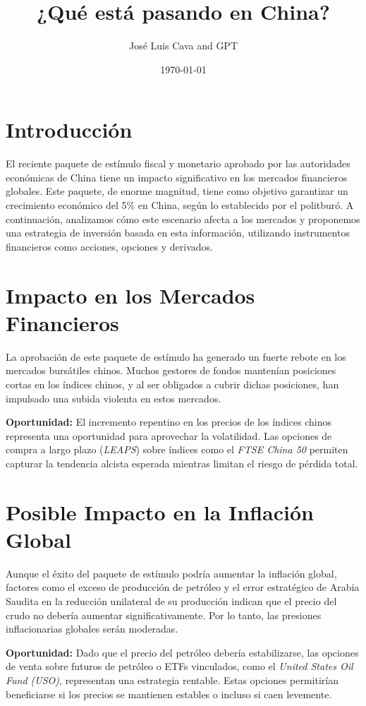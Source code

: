 \documentclass{article}
\title{¿Qué está pasando en China?}
\author{José Luis Cava and GPT}
\date{\today}
\begin{document}
\maketitle

\section*{Introducción}

El reciente paquete de estímulo fiscal y monetario aprobado por las autoridades económicas de China tiene un impacto significativo en los mercados financieros globales. Este paquete, de enorme magnitud, tiene como objetivo garantizar un crecimiento económico del 5\% en China, según lo establecido por el politburó. A continuación, analizamos cómo este escenario afecta a los mercados y proponemos una estrategia de inversión basada en esta información, utilizando instrumentos financieros como acciones, opciones y derivados.

\section*{Impacto en los Mercados Financieros}

La aprobación de este paquete de estímulo ha generado un fuerte rebote en los mercados bursátiles chinos. Muchos gestores de fondos mantenían posiciones cortas en los índices chinos, y al ser obligados a cubrir dichas posiciones, han impulsado una subida violenta en estos mercados.

\textbf{Oportunidad:} El incremento repentino en los precios de los índices chinos representa una oportunidad para aprovechar la volatilidad. Las opciones de compra a largo plazo (\emph{LEAPS}) sobre índices como el \emph{FTSE China 50} permiten capturar la tendencia alcista esperada mientras limitan el riesgo de pérdida total.

\section*{Posible Impacto en la Inflación Global}

Aunque el éxito del paquete de estímulo podría aumentar la inflación global, factores como el exceso de producción de petróleo y el error estratégico de Arabia Saudita en la reducción unilateral de su producción indican que el precio del crudo no debería aumentar significativamente. Por lo tanto, las presiones inflacionarias globales serán moderadas.

\textbf{Oportunidad:} Dado que el precio del petróleo debería estabilizarse, las opciones de venta sobre futuros de petróleo o ETFs vinculados, como el \emph{United States Oil Fund (USO)}, representan una estrategia rentable. Estas opciones permitirían beneficiarse si los precios se mantienen estables o incluso si caen levemente.
\end{document}
